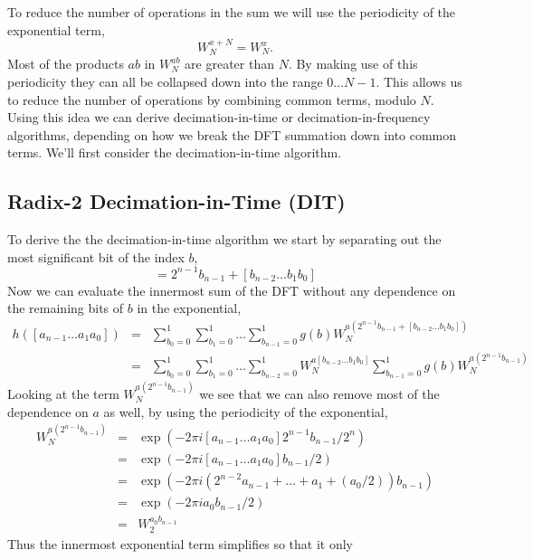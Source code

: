 \documentclass[fleqn,12pt]{article}
\begin{document}
To reduce the number of operations in the sum we will use the
periodicity of the exponential term,
%
\begin{equation}
W_N^{x+N} = W_N^{x}.
\end{equation}
%
Most of the products $ab$ in $W_N^{ab}$ are greater than $N$. By
making use of this periodicity they can all be collapsed down into the
range $0\dots N-1$. This allows us to reduce the number of operations
by combining common terms, modulo $N$. Using this idea we can derive
decimation-in-time or decimation-in-frequency algorithms, depending on
how we break the DFT summation down into common terms. We'll first
consider the decimation-in-time algorithm.

\subsection{Radix-2 Decimation-in-Time (DIT)}
%
To derive the the decimation-in-time algorithm we start by separating
out the most significant bit of the index $b$,
%
\begin{equation}
[b_{n-1} \dots b_1 b_0] = 2^{n-1}b_{n-1} + [b_{n-2} \dots b_1 b_0]
\end{equation}
%
Now we can evaluate the innermost sum of the DFT without any
dependence on the remaining bits of $b$ in the exponential,
%
\begin{eqnarray} 
h([a_{n-1} \dots a_1 a_0]) &=& 
\sum_{b_0=0}^{1} 
\sum_{b_1=0}^{1} 
\dots
\sum_{b_{n-1}=0}^{1} 
 g(b) 
W_N^{a(2^{n-1}b_{n-1}+[b_{n-2} \dots b_1 b_0])} \\
 &=& 
\sum_{b_0=0}^{1} 
\sum_{b_1=0}^{1} 
\dots
\sum_{b_{n-2}=0}^{1} 
W_N^{a[b_{n-2} \dots b_1 b_0]}
\sum_{b_{n-1}=0}^{1} 
 g(b) 
W_N^{a(2^{n-1}b_{n-1})}
\end{eqnarray}
%
Looking at the term $W_N^{a(2^{n-1}b_{n-1})}$ we see that we can also
remove most of the dependence on $a$ as well, by using the periodicity of the
exponential,
%
\begin{eqnarray}
W_N^{a(2^{n-1}b_{n-1})} &=&
\exp(-2\pi i [a_{n-1} \dots a_1 a_0] 2^{n-1} b_{n-1}/ 2^n )\\
&=& \exp(-2\pi i [a_{n-1} \dots a_1 a_0] b_{n-1}/ 2 )\\
&=& \exp(-2\pi i ( 2^{n-2}a_{n-1} + \dots + a_1 + (a_0/2)) b_{n-1} )\\
&=& \exp(-2\pi i a_0 b_{n-1}/2 ) \\
&=& W_2^{a_0 b_{n-1}}
\end{eqnarray}
%
Thus the innermost exponential term simplifies so that it only
\end{document}
